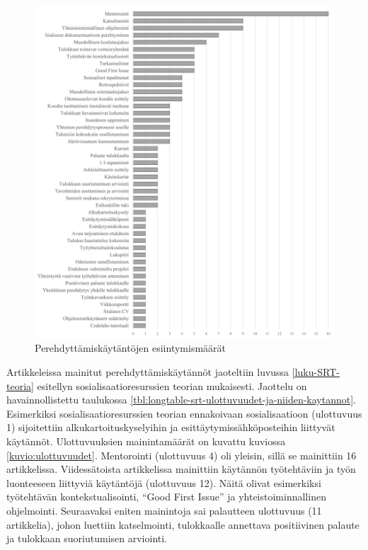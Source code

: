 \documentclass[utf8]{gradu3}
\begin{document}
\begin{figure}[h]
    \centering
    \includegraphics[width=13.25cm]{media/45-kaytannot.png}
    \caption{Perehdyttämiskäytäntöjen esiintymismäärät}
    \label{kuvio:kaytannot}
\end{figure}

Artikkeleissa mainitut perehdyttämiskäytännöt jaoteltiin luvussa \ref{luku-SRT-teoria} esitellyn sosialisaatioresurssien teorian mukaisesti. Jaottelu on havainnollistettu taulukossa \ref{tbl:longtable-srt-ulottuvuudet-ja-niiden-kaytannot}. Esimerkiksi sosialisaatioresurssien teorian ennakoivaan sosialisaatioon (ulottuvuus 1) sijoitettiin alkukartoituskyselyihin ja esittäytymissähköposteihin liittyvät käytännöt. Ulottuvuuksien mainintamäärät on kuvattu kuviossa \ref{kuvio:ulottuvuudet}. Mentorointi (ulottuvuus 4) oli yleisin, sillä se mainittiin 16 artikkelissa. Viidessätoista artikkelissa mainittiin käytännön työtehtäviin ja työn luonteeseen liittyviä käytäntöjä (ulottuvuus 12). Näitä olivat esimerkiksi työtehtävän kontekstualisointi, ``Good First Issue'' ja yhteistoiminnallinen ohjelmointi. Seuraavaksi eniten mainintoja sai palautteen ulottuvuus (11 artikkelia), johon luettiin katselmointi, tulokkaalle annettava positiivinen palaute ja tulokkaan suoriutumisen arviointi.
\end{document}
